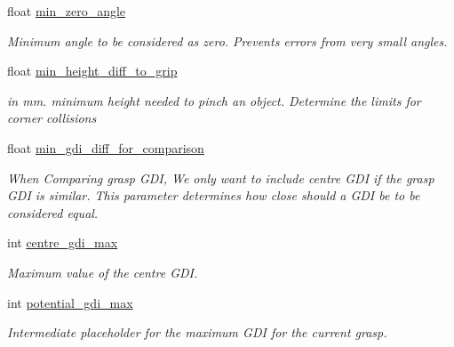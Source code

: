 \begin{DoxyCompactItemize}
\mbox{\label{classTwoFinger_a6fe537b025bf208d56cb1632a1eb5ff0}} 
float \hyperlink{classTwoFinger_a6fe537b025bf208d56cb1632a1eb5ff0}{min\+\_\+zero\+\_\+angle}
\begin{DoxyCompactList}\small\item\em Minimum angle to be considered as zero. Prevents errors from very small angles. \end{DoxyCompactList}\item 
\mbox{\label{classTwoFinger_a0630b6d72b7f2acfb730758a7bf3907a}} 
float \hyperlink{classTwoFinger_a0630b6d72b7f2acfb730758a7bf3907a}{min\+\_\+height\+\_\+diff\+\_\+to\+\_\+grip}
\begin{DoxyCompactList}\small\item\em in mm. minimum height needed to pinch an object. Determine the limits for corner collisions \end{DoxyCompactList}\item 
\mbox{\label{classTwoFinger_aebc0eacece70162a016a2f670a17c811}} 
float \hyperlink{classTwoFinger_aebc0eacece70162a016a2f670a17c811}{min\+\_\+gdi\+\_\+diff\+\_\+for\+\_\+comparison}
\begin{DoxyCompactList}\small\item\em When Comparing grasp G\+DI, We only want to include centre G\+DI if the grasp G\+DI is similar. This parameter determines how close should a G\+DI be to be considered equal. \end{DoxyCompactList}\item 
\mbox{\label{classTwoFinger_a0ef7222d080314043525e634e163cc0a}} 
int \hyperlink{classTwoFinger_a0ef7222d080314043525e634e163cc0a}{centre\+\_\+gdi\+\_\+max}
\begin{DoxyCompactList}\small\item\em Maximum value of the centre G\+DI. \end{DoxyCompactList}\item 
\mbox{\label{classTwoFinger_a568d04dcbb39579810299084850a41a4}} 
int \hyperlink{classTwoFinger_a568d04dcbb39579810299084850a41a4}{potential\+\_\+gdi\+\_\+max}
\begin{DoxyCompactList}\small\item\em Intermediate placeholder for the maximum G\+DI for the current grasp. \end{DoxyCompactList}\item 

\end{DoxyCompactItemize}
